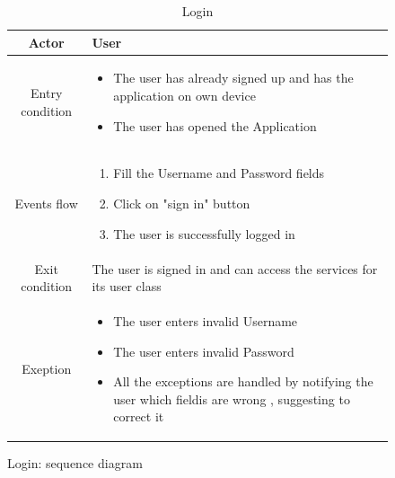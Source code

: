 \documentclass{article}
\begin{document}
	\begin{figure}[H]
		\begin{table} [H]
		\begin{center}
		\caption{Login}
		\begin{tabular}{|c|p{8cm}|}
			\hline
			Actor			&	User\\
			\hline
			Entry condition	&	\begin{itemize}[noitemsep,topsep=0pt]
									\item The user has already signed up and has 
									the application on own device
									\item The user has opened the Application
								\end{itemize}\\
			\hline
			Events flow		&	\begin{enumerate}[noitemsep,topsep=0pt]
									\item Fill the Username and Password fields 
									\item Click on "sign in" button
									\item The user is successfully logged in 
								\end{enumerate}\\
			\hline
			Exit condition	&	The user is signed in and can access the services 
								for its user class\\
			\hline
			Exeption			&	\begin{itemize}[noitemsep,topsep=0pt]
									\item The user enters invalid Username
									\item The user enters invalid Password
									\item All the exceptions are handled by notifying 
									the user which fieldis are wrong , suggesting to correct it
								\end{itemize}\\
			\hline
		\end{tabular}
		\end{center}
		\end{table} 
		
		\centering
		\def\svgwidth{\columnwidth}
		
		\caption{Login: sequence diagram}
	\end{figure}
	
\end{document}
